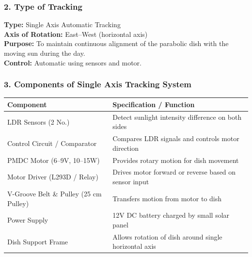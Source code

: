 \documentclass[12pt,a4paper]{article}
\begin{document}



\subsubsection*{2. Type of Tracking}
\noindent
{\fontsize{10}{14}\selectfont
\textbf{Type:} Single Axis Automatic Tracking\\[1mm]
\textbf{Axis of Rotation:} East--West (horizontal axis)\\[1mm]
\textbf{Purpose:} To maintain continuous alignment of the parabolic dish with the moving sun during the day.\\[1mm]
\textbf{Control:} Automatic using sensors and motor.
}

\vspace{3mm}
\subsubsection*{3. Components of Single Axis Tracking System}
\begin{center}
\renewcommand{\arraystretch}{1.2}
\begin{tabular}{|p{42mm}|p{82mm}|}
\hline
\rowcolor{gray!20}
\textbf{Component} & \textbf{Specification / Function} \\
\hline
LDR Sensors (2 No.) & Detect sunlight intensity difference on both sides \\
\hline
Control Circuit / Comparator & Compares LDR signals and controls motor direction \\
\hline
PMDC Motor (6--9V, 10--15W) & Provides rotary motion for dish movement \\
\hline
Motor Driver (L293D / Relay) & Drives motor forward or reverse based on sensor input \\
\hline
V-Groove Belt \& Pulley (25 cm Pulley) & Transfers motion from motor to dish \\
\hline
Power Supply & 12V DC battery charged by small solar panel \\
\hline
Dish Support Frame & Allows rotation of dish around single horizontal axis \\
\hline
\end{tabular}
\end{center}
\end{document}

